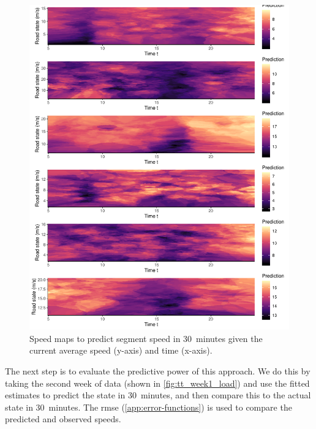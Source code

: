 \begin{knitrout}\small
{}\color{fgcolor}\begin{figure}

{\centering \includegraphics[width=\linewidth]{figure/tt_week0_grid-1} 

}

\caption[Speed maps to predict segment speed in 30~minutes given the current state]{Speed maps to predict segment speed in 30~minutes given the current average speed (y-axis) and time (x-axis).}\label{fig:tt_week0_grid}
\end{figure}


\end{knitrout}

The next step is to evaluate the predictive power of this approach. We do this by taking the second week of data (shown in \cref{fig:tt_week1_load}) and use the fitted estimates to predict the state in 30~minutes, and then compare this to the actual state in 30~minutes. The \gls{rmse} (\cref{app:error-functions}) is used to compare the predicted and observed speeds.



